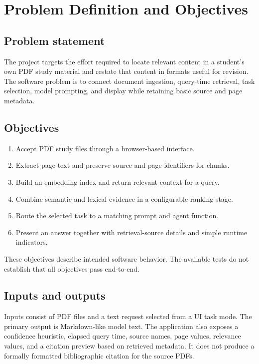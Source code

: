 \chapter{Problem Definition and Objectives}
\label{ch:problem}

\section{Problem statement}
The project targets the effort required to locate relevant content in a student's own PDF study material and restate that content in formats useful for revision. The software problem is to connect document ingestion, query-time retrieval, task selection, model prompting, and display while retaining basic source and page metadata.

\section{Objectives}
\begin{enumerate}
  \item Accept PDF study files through a browser-based interface.
  \item Extract page text and preserve source and page identifiers for chunks.
  \item Build an embedding index and return relevant context for a query.
  \item Combine semantic and lexical evidence in a configurable ranking stage.
  \item Route the selected task to a matching prompt and agent function.
  \item Present an answer together with retrieval-source details and simple runtime indicators.
\end{enumerate}
These objectives describe intended software behavior. The available tests do not establish that all objectives pass end-to-end.

\section{Inputs and outputs}
Inputs consist of PDF files and a text request selected from a UI task mode. The primary output is Markdown-like model text. The application also exposes a confidence heuristic, elapsed query time, source names, page values, relevance values, and a citation preview based on retrieved metadata. It does not produce a formally formatted bibliographic citation for the source PDFs.

